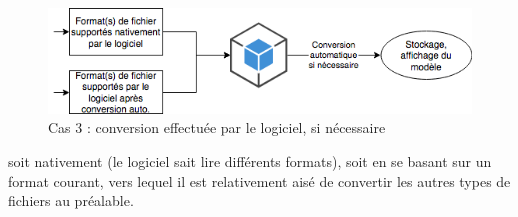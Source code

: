 \begin{figure}
    \centering
    \includegraphics[width=\linewidth]{Figures/file-importation-process-auto-conversion.png}
    \caption{Cas 3 : conversion effectuée par le logiciel, si nécessaire}
    \label{fig:file-importation-process-auto-conversion}
\end{figure}


soit nativement (le logiciel sait lire différents formats), soit en se basant sur un format courant, vers lequel il est relativement aisé de convertir les autres types de fichiers au préalable.
